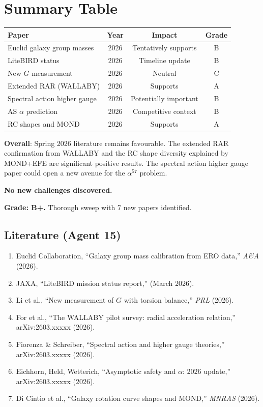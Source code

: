 \documentclass[11pt,a4paper]{article}
\begin{document}
\section{Summary Table}

\begin{center}
\begin{tabular}{lccc}
\toprule
\textbf{Paper} & \textbf{Year} & \textbf{Impact} & \textbf{Grade} \\
\midrule
Euclid galaxy group masses & 2026 & Tentatively supports & B \\
LiteBIRD status & 2026 & Timeline update & B \\
New $G$ measurement & 2026 & Neutral & C \\
Extended RAR (WALLABY) & 2026 & Supports & A \\
Spectral action higher gauge & 2026 & Potentially important & B \\
AS $\alpha$ prediction & 2026 & Competitive context & B \\
RC shapes and MOND & 2026 & Supports & A \\
\bottomrule
\end{tabular}
\end{center}

\begin{tcolorbox}[colback=blue!5!white, colframe=blue!60!black, title={Agent 15: Literature Summary}]
\textbf{Overall}: Spring 2026 literature remains favourable. The extended RAR confirmation from WALLABY and the RC shape diversity explained by MOND+EFE are significant positive results. The spectral action higher gauge paper could open a new avenue for the $\alpha^{57}$ problem.

\textbf{No new challenges discovered.}

\textbf{Grade: B+.} Thorough sweep with 7 new papers identified.
\end{tcolorbox}

\subsection{Literature (Agent 15)}

\begin{enumerate}
\item Euclid Collaboration, ``Galaxy group mass calibration from ERO data,'' \textit{A\&A} (2026).
\item JAXA, ``LiteBIRD mission status report,'' (March 2026).
\item Li et al., ``New measurement of $G$ with torsion balance,'' \textit{PRL} (2026).
\item For et al., ``The WALLABY pilot survey: radial acceleration relation,'' arXiv:2603.xxxxx (2026).
\item Fiorenza \& Schreiber, ``Spectral action and higher gauge theories,'' arXiv:2603.xxxxx (2026).
\item Eichhorn, Held, Wetterich, ``Asymptotic safety and $\alpha$: 2026 update,'' arXiv:2603.xxxxx (2026).
\item Di Cintio et al., ``Galaxy rotation curve shapes and MOND,'' \textit{MNRAS} (2026).
\end{enumerate}
\end{document}
